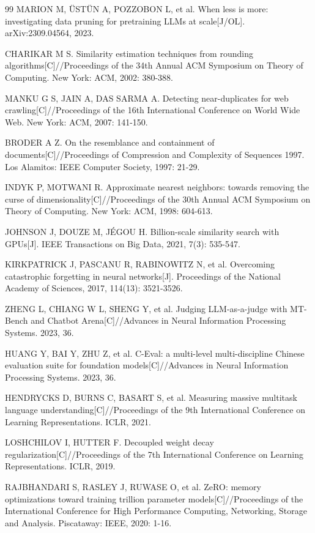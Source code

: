 \documentclass[fontset=fandol,type=master,campus=shenzhen,etitleauto=true]{hithesisbook}
\begin{document}
\begin{thebibliography}{99}
 MARION M, ÜSTÜN A, POZZOBON L, et al. When less is more: investigating data pruning for pretraining LLMs at scale[J/OL]. arXiv:2309.04564, 2023.

 CHARIKAR M S. Similarity estimation techniques from rounding algorithms[C]//Proceedings of the 34th Annual ACM Symposium on Theory of Computing. New York: ACM, 2002: 380-388.

 MANKU G S, JAIN A, DAS SARMA A. Detecting near-duplicates for web crawling[C]//Proceedings of the 16th International Conference on World Wide Web. New York: ACM, 2007: 141-150.

 BRODER A Z. On the resemblance and containment of documents[C]//Proceedings of Compression and Complexity of Sequences 1997. Los Alamitos: IEEE Computer Society, 1997: 21-29.

 INDYK P, MOTWANI R. Approximate nearest neighbors: towards removing the curse of dimensionality[C]//Proceedings of the 30th Annual ACM Symposium on Theory of Computing. New York: ACM, 1998: 604-613.

 JOHNSON J, DOUZE M, JÉGOU H. Billion-scale similarity search with GPUs[J]. IEEE Transactions on Big Data, 2021, 7(3): 535-547.

 KIRKPATRICK J, PASCANU R, RABINOWITZ N, et al. Overcoming catastrophic forgetting in neural networks[J]. Proceedings of the National Academy of Sciences, 2017, 114(13): 3521-3526.

 ZHENG L, CHIANG W L, SHENG Y, et al. Judging LLM-as-a-judge with MT-Bench and Chatbot Arena[C]//Advances in Neural Information Processing Systems. 2023, 36.

 HUANG Y, BAI Y, ZHU Z, et al. C-Eval: a multi-level multi-discipline Chinese evaluation suite for foundation models[C]//Advances in Neural Information Processing Systems. 2023, 36.

 HENDRYCKS D, BURNS C, BASART S, et al. Measuring massive multitask language understanding[C]//Proceedings of the 9th International Conference on Learning Representations. ICLR, 2021.

 LOSHCHILOV I, HUTTER F. Decoupled weight decay regularization[C]//Proceedings of the 7th International Conference on Learning Representations. ICLR, 2019.

 RAJBHANDARI S, RASLEY J, RUWASE O, et al. ZeRO: memory optimizations toward training trillion parameter models[C]//Proceedings of the International Conference for High Performance Computing, Networking, Storage and Analysis. Piscataway: IEEE, 2020: 1-16.


\end{thebibliography}
\end{document}
